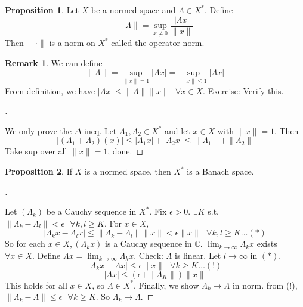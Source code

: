 \documentclass{article}
\theoremstyle{definition}
\newtheorem{rem}{Remark}
\newtheorem{prop}{Proposition}
\newenvironment{proofs}[1][\proofname]{%
  \begin{proof}[#1]$ $\par\nobreak\ignorespaces
}{%
  \end{proof}
}
\newcommand{\sfa}{\text{  } \forall}
\begin{document}
\begin{prop}
	Let $X$ be a normed space and $\Lambda \in X^*$. 
	Define 
	\[
		\|\Lambda\| = \sup_{x \neq 0} \frac{|\Lambda x|}{\|x\|}
	\]
	Then $\| \cdot \|$ is a norm on $X^*$ called the operator norm. 
\end{prop}

\begin{rem}
	We can define
	\[
		\| \Lambda \| = \sup_{\|x\| = 1} |\Lambda x| = \sup_{\| x \| \leq 1} |\Lambda x|
	\]
	From definition, we have $|\Lambda x| \leq \| \Lambda \| \|x\| \sfa x \in X$. 
	Exercise: Verify this. 
\end{rem}

\begin{proofs}
	We only prove the $\Delta$-ineq. 
	Let $\Lambda_1, \Lambda_2 \in X^*$ and let $x \in X$ with $\|x\| = 1$. 
	Then
	\[
		|(\Lambda_1 + \Lambda_2)(x)| \leq |\Lambda_1 x| + |\Lambda_2 x| \leq \|\Lambda_1 \| + \| \Lambda_2 \|
	\]
	Take sup over all $\|x\| = 1$, done.
\end{proofs}

\begin{prop}
	If $X$ is a normed space, then $X^*$ is a Banach space.
\end{prop}

\begin{proofs}
	Let $(\Lambda_k)$ be a Cauchy sequence in $X^*$.
	Fix $\epsilon > 0$.
	$\exists K$ s.t. $\|\Lambda_k - \Lambda_l\| < \epsilon \sfa k, l \geq K$. 
	For $x \in X$, 
	\[
		|\Lambda_k x- \Lambda_l x| \leq \|\Lambda_k - \Lambda_l \| \|x \| < \epsilon \|x\| \sfa k, l \geq K \hdots (*)
	\]
	So for each $x \in X, (\Lambda_k x)$ is a Cauchy sequence in $\mathbb{C}$.
	$\lim_{k \to \infty} \Lambda_k x$ exists $\forall x \in X$. 
	Define $\Lambda x = \lim_{k \to \infty} \Lambda_k x$.
	Check: $\Lambda$ is linear. 
	Let $l \to \infty$ in $(*)$.
	\[
		|\Lambda_k x - \Lambda x| \leq \epsilon \|x\| \sfa k \geq K \hdots (!)
	\]
	\[
		|\Lambda x| \leq (\epsilon + \|\Lambda_{K}\|) \|x\|
	\]
	This holds for all $x \in X$, so $\Lambda \in X^*$. Finally, we show $\Lambda_k \to \Lambda$ in norm.
	from (!), $\| \Lambda_k - \Lambda\| \leq \epsilon \sfa k \geq K$.
	So $\Lambda_k \to \Lambda$.
\end{proofs}
\end{document}
